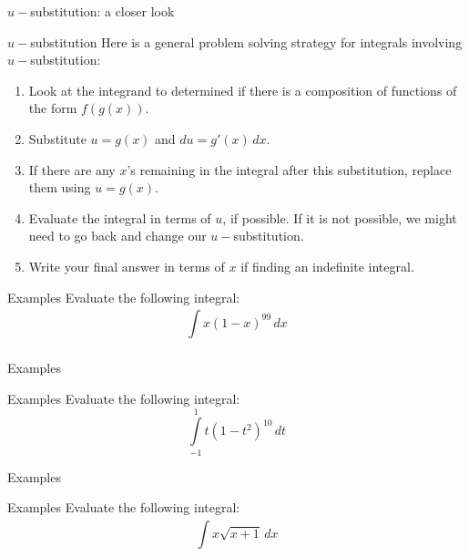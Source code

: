 \documentclass[presentation]{beamer}
\begin{document}
\begin{frame}[label={sec:org72437e2}]{\(u-\)substitution: a closer look}
\end{frame}

\begin{frame}[label={sec:org8d93611}]{\(u-\)substitution}
Here is a general problem solving strategy for integrals involving
\(u-\)substitution: 

\begin{enumerate}
\item Look at the integrand to determined if there is a composition of
functions of the form \(f \left( g \left( x \right) \right)\).
\item Substitute \(u = g \left( x \right)\) and \(du = g' \left( x
   \right)\,dx\).
\item If there are any \(x\)'s remaining in the integral after this
substitution, replace them using \(u = g(x)\).
\item Evaluate the integral in terms of \(u\), if possible.  If it is
not possible, we might need to go back and change our \(u-\)substitution.
\item Write your final answer in terms of \(x\) if finding an indefinite
integral.
\end{enumerate}
\end{frame}

\begin{frame}[label={sec:org8409de6}]{Examples}
Evaluate the following integral:
\[
\int\limits_{}^{} x \left( 1-x \right)^{99}\,dx \]
\vspace{10in}
\end{frame}


\begin{frame}[label={sec:orga6f2c38}]{Examples}
\end{frame}

\begin{frame}[label={sec:org5894ac5}]{Examples}
Evaluate the following integral:
\[
\int\limits_{-1}^{1}t \left( 1-t^2 \right)^{10}\,dt \]
\vspace{10in}
\end{frame}

\begin{frame}[label={sec:org12994b9}]{Examples}
\end{frame}

\begin{frame}[label={sec:org06aa1a3}]{Examples}
Evaluate the following integral:
\[
\int\limits_{}^{}x \sqrt{x+1}\,dx \]
\vspace{10in}
\end{frame}
\end{document}
